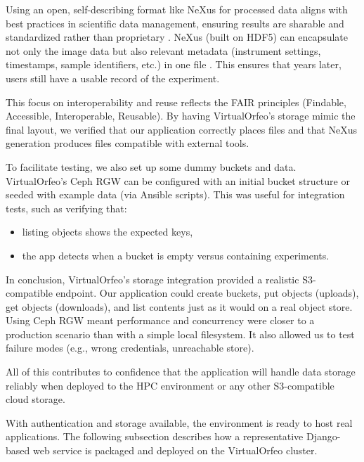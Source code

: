 \medskip

Using an open, self-describing format like NeXus for processed data aligns with 
best practices in scientific data management, ensuring results are sharable and 
standardized rather than proprietary \parencite{Koennecke2015NeXusFormat, 
	Korir2024TenRecs}. NeXus (built on HDF5) can encapsulate not only the image data 
but also relevant metadata (instrument settings, timestamps, sample identifiers, 
etc.) in one file \parencite{Koennecke2015NeXusFormat}. This ensures that years 
later, users still have a usable record of the experiment.  

This focus on interoperability and reuse reflects the FAIR principles (Findable, 
Accessible, Interoperable, Reusable). By having VirtualOrfeo’s storage mimic the 
final layout, we verified that our application correctly places files and that 
NeXus generation produces files compatible with external tools.

\medskip

To facilitate testing, we also set up some dummy buckets and data. VirtualOrfeo’s 
Ceph RGW can be configured with an initial bucket structure or seeded with 
example data (via Ansible scripts). This was useful for integration tests, such 
as verifying that:  

\begin{itemize}
	\item listing objects shows the expected keys,  
	\item the app detects when a bucket is empty versus containing experiments.  
\end{itemize}

\medskip

In conclusion, VirtualOrfeo’s storage integration provided a realistic 
S3-compatible endpoint. Our application could create buckets, put objects 
(uploads), get objects (downloads), and list contents just as it would on a real 
object store. Using Ceph RGW meant performance and concurrency were closer to a 
production scenario than with a simple local filesystem. It also allowed us to 
test failure modes (e.g., wrong credentials, unreachable store).  

All of this contributes to confidence that the application will handle data 
storage reliably when deployed to the HPC environment or any other S3-compatible 
cloud storage.

\medskip
\noindent With authentication and storage available, the environment is ready 
to host real applications. 
The following subsection describes how a representative Django-based web service 
is packaged and deployed on the VirtualOrfeo cluster.

